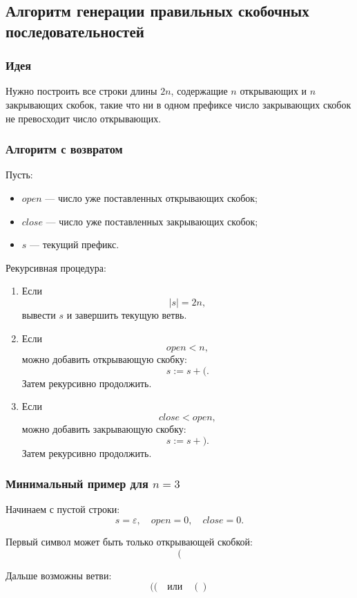 \documentclass[12pt,a4paper]{article}
\begin{document}
\subsection{Алгоритм генерации правильных скобочных последовательностей}

\subsubsection*{Идея}

Нужно построить все строки длины $2n$, содержащие $n$ открывающих и $n$ закрывающих скобок, такие что ни в одном префиксе число закрывающих скобок не превосходит число открывающих.

\subsubsection*{Алгоритм с возвратом}

Пусть:
\begin{itemize}
    \item $open$ --- число уже поставленных открывающих скобок;
    \item $close$ --- число уже поставленных закрывающих скобок;
    \item $s$ --- текущий префикс.
\end{itemize}

Рекурсивная процедура:

\begin{enumerate}
    \item Если
    \[
    |s|=2n,
    \]
    вывести $s$ и завершить текущую ветвь.
    \item Если
    \[
    open<n,
    \]
    можно добавить открывающую скобку:
    \[
    s:=s+\texttt{(}.
    \]
    Затем рекурсивно продолжить.
    \item Если
    \[
    close<open,
    \]
    можно добавить закрывающую скобку:
    \[
    s:=s+\texttt{)}.
    \]
    Затем рекурсивно продолжить.
\end{enumerate}

\subsubsection*{Минимальный пример для $n=3$}

Начинаем с пустой строки:
\[
s=\varepsilon,\quad open=0,\quad close=0.
\]

Первый символ может быть только открывающей скобкой:
\[
(
\]

Дальше возможны ветви:
\[
(( \quad \text{или} \quad ()
\]
\end{document}
